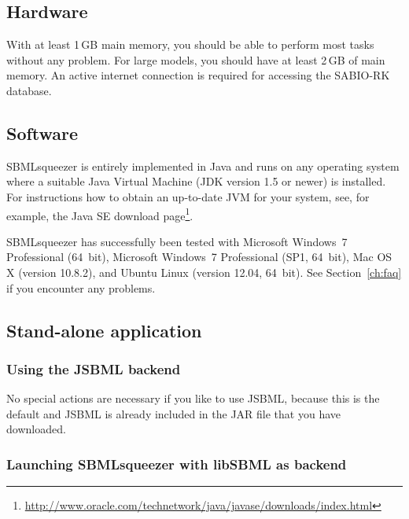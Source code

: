 \subsection{Hardware}

With at least 1\,GB main memory, you should be able to perform most tasks
without any problem. For large models, you should have at least 2\,GB of main
memory. An active internet connection is required for accessing the SABIO-RK
database.

\subsection{Software}

SBMLsqueezer is entirely implemented in Java and runs on any operating system
where a suitable Java Virtual Machine (JDK version 1.5 or newer) is installed.
For instructions how to obtain an up-to-date JVM for your system, see, for 
example, the Java SE download page\footnote{\url{http://www.oracle.com/technetwork/java/javase/downloads/index.html}\label{fn:jvmldl}}.

SBMLsqueezer has successfully been tested with
Microsoft Windows~7 Professional (64~bit),
Microsoft Windows~7 Professional (SP1, 64~bit),
Mac OS X (version 10.8.2), and Ubuntu Linux (version 12.04, 64~bit).
See Section~\vref{ch:faq} if you encounter any problems.

\subsection{Stand-alone application}

\subsubsection{Using the JSBML backend}

No special actions are necessary if you like to use JSBML, because this is the
default and JSBML is already included in the JAR file that you have downloaded.

\subsubsection{Launching SBMLsqueezer with libSBML as backend}


